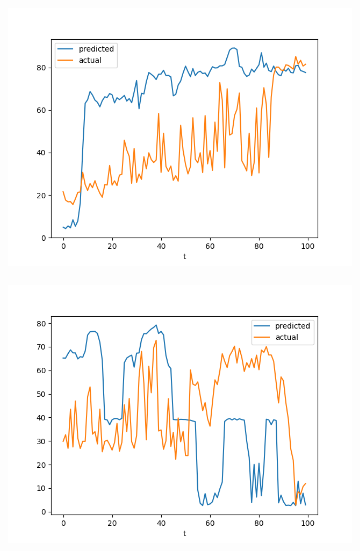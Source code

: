 \documentclass[runningheads]{llncs}
\begin{document}
\begin{figure}[hp]
\begin{subfigure}{\figwidth}
                \includegraphics[width=\textwidth]{results/evaluation/f_model_graph_p50.png}
        \end{subfigure}
        \begin{subfigure}{\figwidth}
                \includegraphics[width=\textwidth]{results/evaluation/f_model_graph_p60.png}
        \end{subfigure}
        \begin{subfigure}{\figwidth}

\end{subfigure}
\end{figure}
\end{document}
